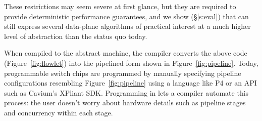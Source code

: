 These restrictions may seem severe at first glance, but they are required to
provide deterministic performance guarantees, and we show (\S\ref{s:eval}) that
\pktlanguage can still express several data-plane algorithms  of practical
interest at a much higher level of abstraction than the status quo today.

When compiled to the \absmachine abstract machine, the \pktlanguage compiler
converts the above code (Figure~\ref{fig:flowlet}) into the pipelined form
shown in Figure~\ref{fig:pipeline}. Today, programmable switch chips are
programmed by manually specifying pipeline configurations resembling
Figure~\ref{fig:pipeline} using a language like P4 or an API such as Cavium's
XPliant SDK. Programming in \pktlanguage lets a compiler automate this process:
the user doesn't worry about hardware details such as pipeline stages and
concurrency within each stage.



